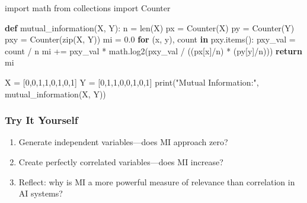 \documentclass[
  letterpaper,
  DIV=11,
  numbers=noendperiod]{scrreprt}
\newenvironment{Shaded}{\begin{snugshade}}{\end{snugshade}}
\newcommand{\BuiltInTok}[1]{\textcolor[rgb]{0.00,0.23,0.31}{#1}}
\newcommand{\ControlFlowTok}[1]{\textcolor[rgb]{0.00,0.23,0.31}{\textbf{#1}}}
\newcommand{\DecValTok}[1]{\textcolor[rgb]{0.68,0.00,0.00}{#1}}
\newcommand{\FloatTok}[1]{\textcolor[rgb]{0.68,0.00,0.00}{#1}}
\newcommand{\ImportTok}[1]{\textcolor[rgb]{0.00,0.46,0.62}{#1}}
\newcommand{\KeywordTok}[1]{\textcolor[rgb]{0.00,0.23,0.31}{\textbf{#1}}}
\newcommand{\NormalTok}[1]{\textcolor[rgb]{0.00,0.23,0.31}{#1}}
\newcommand{\OperatorTok}[1]{\textcolor[rgb]{0.37,0.37,0.37}{#1}}
\newcommand{\StringTok}[1]{\textcolor[rgb]{0.13,0.47,0.30}{#1}}
\providecommand{\tightlist}{%
  \setlength{\itemsep}{0pt}\setlength{\parskip}{0pt}}
\begin{document}
\begin{Shaded}
\begin{Highlighting}[]
\ImportTok{import}\NormalTok{ math}
\ImportTok{from}\NormalTok{ collections }\ImportTok{import}\NormalTok{ Counter}

\KeywordTok{def}\NormalTok{ mutual\_information(X, Y):}
\NormalTok{    n }\OperatorTok{=} \BuiltInTok{len}\NormalTok{(X)}
\NormalTok{    px }\OperatorTok{=}\NormalTok{ Counter(X)}
\NormalTok{    py }\OperatorTok{=}\NormalTok{ Counter(Y)}
\NormalTok{    pxy }\OperatorTok{=}\NormalTok{ Counter(}\BuiltInTok{zip}\NormalTok{(X, Y))}
\NormalTok{    mi }\OperatorTok{=} \FloatTok{0.0}
    \ControlFlowTok{for}\NormalTok{ (x, y), count }\KeywordTok{in}\NormalTok{ pxy.items():}
\NormalTok{        pxy\_val }\OperatorTok{=}\NormalTok{ count }\OperatorTok{/}\NormalTok{ n}
\NormalTok{        mi }\OperatorTok{+=}\NormalTok{ pxy\_val }\OperatorTok{*}\NormalTok{ math.log2(pxy\_val }\OperatorTok{/}\NormalTok{ ((px[x]}\OperatorTok{/}\NormalTok{n) }\OperatorTok{*}\NormalTok{ (py[y]}\OperatorTok{/}\NormalTok{n)))}
    \ControlFlowTok{return}\NormalTok{ mi}

\NormalTok{X }\OperatorTok{=}\NormalTok{ [}\DecValTok{0}\NormalTok{,}\DecValTok{0}\NormalTok{,}\DecValTok{1}\NormalTok{,}\DecValTok{1}\NormalTok{,}\DecValTok{0}\NormalTok{,}\DecValTok{1}\NormalTok{,}\DecValTok{0}\NormalTok{,}\DecValTok{1}\NormalTok{]}
\NormalTok{Y }\OperatorTok{=}\NormalTok{ [}\DecValTok{0}\NormalTok{,}\DecValTok{1}\NormalTok{,}\DecValTok{1}\NormalTok{,}\DecValTok{0}\NormalTok{,}\DecValTok{0}\NormalTok{,}\DecValTok{1}\NormalTok{,}\DecValTok{0}\NormalTok{,}\DecValTok{1}\NormalTok{]}
\BuiltInTok{print}\NormalTok{(}\StringTok{"Mutual Information:"}\NormalTok{, mutual\_information(X, Y))}
\end{Highlighting}
\end{Shaded}

\subsubsection{Try It Yourself}\label{try-it-yourself-24}

\begin{enumerate}
\def\labelenumi{\arabic{enumi}.}
\tightlist
\item
  Generate independent variables---does MI approach zero?
\item
  Create perfectly correlated variables---does MI increase?
\item
  Reflect: why is MI a more powerful measure of relevance than
  correlation in AI systems?
\end{enumerate}
\end{document}

